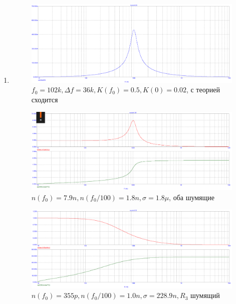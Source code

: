 \documentclass[a4paper, 12pt]{article}%
\begin{document}
\begin{enumerate}

\item

\FloatBarrier
\begin{figure}[h!]
    \centering
    \includegraphics[scale=0.3]{images/mod4_3_1.png}
    \caption{$f_0 = 102k, \Delta f = 36k, K(f_0) = 0.5, K(0) = 0.02$, с теорией сходится}
    \label{fig:m431}
\end{figure}

\begin{figure}[h!]
    \centering
    \includegraphics[scale=0.3]{images/mod4_3_2_1.png}
    \caption{$n(f_0) = 7.9n, n(f_0/100) = 1.8n, \sigma = 1.8\mu$, оба шумящие}
    \label{fig:m4321}
\end{figure}

\begin{figure}[h!]
    \centering
    \includegraphics[scale=0.3]{images/mod4_3_2_2.png}
    \caption{$n(f_0) = 355p, n(f_0/100) = 1.0n, \sigma = 228.9n, R_3$ шумящий}
    \label{fig:m4322}
\end{figure}


\end{enumerate}
\end{document}
